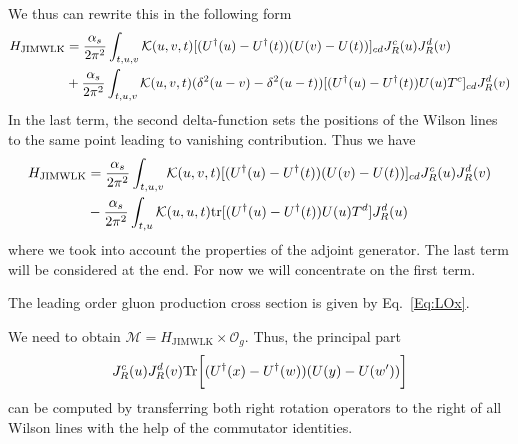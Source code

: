 \documentclass[aps,prd,amsmath,amssymb,nofootinbib]{revtex4-2}
\numberwithin{equation}{section}
\begin{document}
We thus can rewrite this in the following form 
\begin{align}
\label{Eq:HLOComm}
H_{\text{JIMWLK}} &= \frac{\alpha_s}{2 \pi^2} \int_{t,u,v} 
{\cal K}(u, v, t)
[ (U^\dagger(u)  - U^\dagger(t)) (U(v)  - U(t) ) ]_{cd}
J_R ^c(u)
J_R ^d(v)
\nonumber \\ &+ 
\frac{\alpha_s}{2 \pi^2} \int_{t,u,v} 
{\cal K}(u, v, t)
(\delta^2(u-v) - \delta^2(u-t))
[ (U^\dagger(u)  - U^\dagger(t)) U(u) T^c  ]_{cd}
J_R ^d(v)  
\end{align}
In the last term,  the second delta-function sets the positions of the Wilson lines to the same point leading to vanishing contribution. Thus we have 
\begin{align}
\label{Eq:HLOfinal}
H_{\text{JIMWLK}} &= \frac{\alpha_s}{2 \pi^2} \int_{t,u,v} 
{\cal K}(u, v, t)
[ (U^\dagger(u)  - U^\dagger(t)) (U(v)  - U(t) ) ]_{cd}
J_R ^c(u)
J_R ^d(v)
\nonumber \\ &-  
\frac{\alpha_s}{2 \pi^2} \int_{t,u} 
{\cal K}(u, u, t)
{\rm tr}[ (U^\dagger(u)  - U^\dagger(t)) U(u) T^d  ]
J_R ^d(u) 
\end{align}
where we took into account the properties of the adjoint generator. 
The last term  will be  considered at the end. For now we will concentrate on the first term. 

The leading order gluon production cross section is given by Eq.~\eqref{Eq:LOx}.


We need to obtain $\mathcal{M} = H_{\text{JIMWLK}}\times \mathcal{O}_{g}$. Thus, the principal part
\begin{equation}
    J_R^c(u) J_R^d(v) {\rm Tr}  \bigg[( U^\dagger(x) - U^\dagger(w) )( U(y) - U(w') )\bigg] 
\end{equation}
can be computed by transferring both right rotation operators to the right of all Wilson lines with the help of the commutator identities. 
\end{document}

